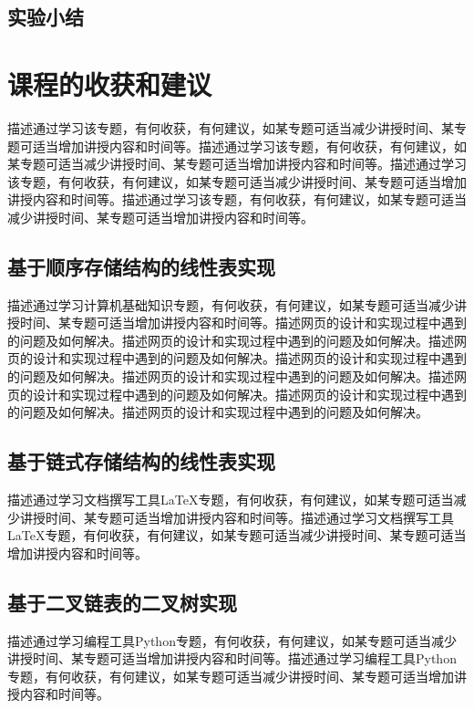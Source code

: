 \documentclass[supercite]{Experimental_Report}
\theoremstyle{definition}
\begin{document}
\subsection{实验小结}
\newpage




\section{课程的收获和建议}

描述通过学习该专题，有何收获，有何建议，如某专题可适当减少讲授时间、某专题可适当增加讲授内容和时间等。描述通过学习该专题，有何收获，有何建议，如某专题可适当减少讲授时间、某专题可适当增加讲授内容和时间等。描述通过学习该专题，有何收获，有何建议，如某专题可适当减少讲授时间、某专题可适当增加讲授内容和时间等。描述通过学习该专题，有何收获，有何建议，如某专题可适当减少讲授时间、某专题可适当增加讲授内容和时间等。

\subsection{基于顺序存储结构的线性表实现}

描述通过学习计算机基础知识专题，有何收获，有何建议，如某专题可适当减少讲授时间、某专题可适当增加讲授内容和时间等。描述网页的设计和实现过程中遇到的问题及如何解决。描述网页的设计和实现过程中遇到的问题及如何解决。描述网页的设计和实现过程中遇到的问题及如何解决。描述网页的设计和实现过程中遇到的问题及如何解决。描述网页的设计和实现过程中遇到的问题及如何解决。描述网页的设计和实现过程中遇到的问题及如何解决。描述网页的设计和实现过程中遇到的问题及如何解决。描述网页的设计和实现过程中遇到的问题及如何解决。

\subsection{基于链式存储结构的线性表实现}

描述通过学习文档撰写工具LaTeX专题，有何收获，有何建议，如某专题可适当减少讲授时间、某专题可适当增加讲授内容和时间等。描述通过学习文档撰写工具LaTeX专题，有何收获，有何建议，如某专题可适当减少讲授时间、某专题可适当增加讲授内容和时间等。

\subsection{基于二叉链表的二叉树实现}

描述通过学习编程工具Python专题，有何收获，有何建议，如某专题可适当减少讲授时间、某专题可适当增加讲授内容和时间等。描述通过学习编程工具Python专题，有何收获，有何建议，如某专题可适当减少讲授时间、某专题可适当增加讲授内容和时间等。
\end{document}
